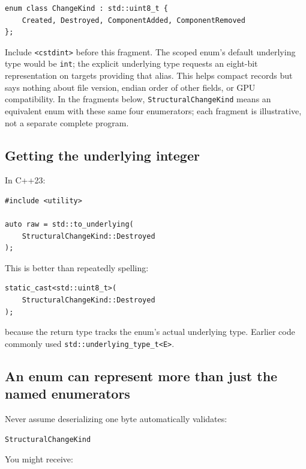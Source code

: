 \begin{verbatim}
enum class ChangeKind : std::uint8_t {
    Created, Destroyed, ComponentAdded, ComponentRemoved
};
\end{verbatim}

Include \texttt{\textless{}cstdint\textgreater{}} before this fragment. The scoped enum's default underlying type would be \texttt{int}; the explicit underlying type requests an eight-bit representation on targets providing that alias. This helps compact records but says nothing about file version, endian order of other fields, or GPU compatibility. In the fragments below, \texttt{StructuralChangeKind} means an equivalent enum with these same four enumerators; each fragment is illustrative, not a separate complete program.

\subsection{Getting the underlying integer}\label{01-foundations-i-ch002-getting-the-underlying-integer}

In C++23:

\begin{verbatim}
#include <utility>

auto raw = std::to_underlying(
    StructuralChangeKind::Destroyed
);
\end{verbatim}

This is better than repeatedly spelling:

\begin{verbatim}
static_cast<std::uint8_t>(
    StructuralChangeKind::Destroyed
);
\end{verbatim}

because the return type tracks the enum's actual underlying type. Earlier code commonly used \texttt{std::underlying\_type\_t\textless{}E\textgreater{}}.

\subsection{An enum can represent more than just the named enumerators}\label{01-foundations-i-ch002-an-enum-can-represent-more-than-just-the-named-enumerators}

Never assume deserializing one byte automatically validates:

\begin{verbatim}
StructuralChangeKind
\end{verbatim}

You might receive:

